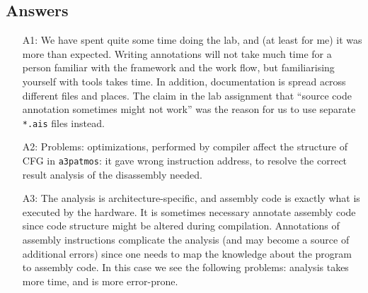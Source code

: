 \documentclass[12pt,a4paper,titlepage,oneside]{article}
\begin{document}
\subsection{Answers}
\begin{itemize}

\item[A1:]
  We have spent quite some time doing the lab, and (at least for me)
  it was more than expected. Writing annotations will not take much
  time for a person familiar with the framework and the work flow, but
  familiarising yourself with tools takes time. In addition,
  documentation is spread across different files and places. The claim
  in the lab assignment that ``source code annotation sometimes might not 
  work'' was the reason for us to use separate \texttt{*.ais} files
  instead. 

\item[A2:]
  Problems: optimizations, performed by compiler affect the structure
  of CFG in \texttt{a3patmos}: it gave wrong instruction address, to
  resolve the correct result analysis of the disassembly needed.

\item[A3:]
  The analysis is architecture-specific, and assembly code
  is exactly what is executed by the hardware. It is sometimes
  necessary annotate assembly code since code structure might be
  altered during compilation. Annotations of assembly instructions
  complicate the analysis (and may become a source of additional errors) 
  since one needs to map the knowledge about the program to assembly code.
  In this case we see the following problems: analysis takes more
  time, and is more error-prone.

\end{itemize}
\end{document}
